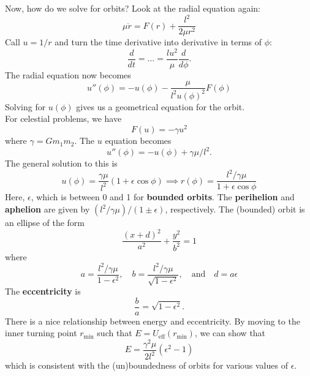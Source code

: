 \documentclass{book}
\theoremstyle{definition}
\newcommand{\f}[2]{\frac{#1}{#2}}
\begin{document}
Now, how do we solve for orbits? Look at the radial equation again:
\begin{equation*}
\boxed{\mu \ddot{r} = F(r) + \f{l^2}{2\mu r^2}}
\end{equation*}
Call $u = 1/r$ and turn the time derivative into derivative in terms of $\phi$: 
\begin{equation*}
\f{d}{dt} = \dots = \f{lu^2}{\mu}\f{d}{d\phi}.
\end{equation*}
The radial equation now becomes
\begin{equation*}
\boxed{u''(\phi) = -u(\phi) - \f{\mu }{l^2 u(\phi)^2}F(\phi)}
\end{equation*}
Solving for $u(\phi)$ gives us a geometrical equation for the orbit. \\

For celestial problems, we have
\begin{equation*}
F(u) = -\gamma u^2
\end{equation*}
where $\gamma = Gm_1m_2$. The $u$ equation becomes
\begin{equation*}
u''(\phi) = -u(\phi) + \gamma \mu / l^2.
\end{equation*}
The general solution to this is 
\begin{equation*}
\boxed{u(\phi) = \f{\gamma \mu}{l^2}(1+ \epsilon \cos\phi) \implies r(\phi) = \f{l^2 / \gamma \mu}{1+\epsilon \cos\phi}}
\end{equation*}
Here, $\epsilon$, which is between 0 and 1 for \textbf{bounded orbits}. The \textbf{perihelion} and \textbf{aphelion} are given by  $(l^2/\gamma \mu)/(1 \pm \epsilon) $, respectively. The (bounded) orbit is an ellipse of the form
\begin{equation*}
\f{(x+d)^2}{a^2} + \f{y^2}{b^2} = 1
\end{equation*}
where 
\begin{equation*}
a = \f{l^2 / \gamma\mu}{{1-\epsilon^2}}, \quad b = \f{l^2/\gamma\mu}{\sqrt{1- \epsilon^2}}, \quad \text{and} \quad d = a\epsilon
\end{equation*}
The \textbf{eccentricity} is 
\begin{equation*}
\f{b}{a}= \sqrt{1- \epsilon^2}.
\end{equation*}
There is a nice relationship between energy and eccentricity. By moving to the inner turning point $r_\text{min}$ such that $E = U_\text{eff}(r_\text{min})$, we can show that
\begin{equation*}
\boxed{E = \f{\gamma^2 \mu}{2l^2}(\epsilon^2 - 1)}
\end{equation*}
which is consistent with the (un)boundedness of orbits for various values of $\epsilon$. \\
\end{document}
